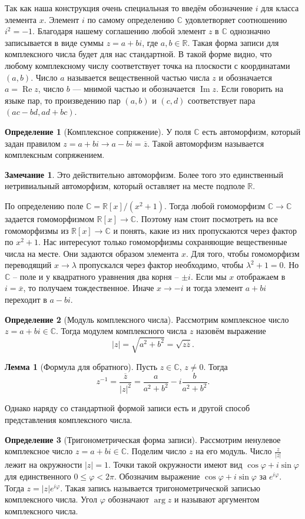 \documentclass[10pt,a4paper,oneside]{book} %
\theoremstyle{definition}
\newtheorem*{rem}{Замечание}
\newtheorem*{defn}{Определение}
\newtheorem{lem}{Лемма}
\newcommand{\mb}[1]{\mathbb{#1}}
\newcommand{\ovl}{\overline}
\newcommand{\im}{\operatorname{Im}}
\newcommand{\re}{\operatorname{Re}}
\def\dfn{\begin{defn}}
\def\edfn{\end{defn}}
\def\lm{\begin{lem}}
\def\elm{\end{lem}}
\def\rm{\begin{rem}}
\def\erm{\end{rem}}
\begin{document}
Так как наша конструкция очень специальная то введём обозначение $i$ для класса элемента $x$. Элемент $i$ по самому определению $\mb C$ удовлетворяет соотношению $i^2=-1$. Благодаря нашему соглашению любой элемент $z$ в $\mb C$ однозначно записывается в виде суммы $z=a+bi$, где $a,b\in \mb R$. Такая форма записи для комплексного числа будет для нас стандартной. В такой форме видно, что любому комплексному числу соответствует точка на плоскости с координатами $(a,b)$. Число $a$ называется вещественной частью числа $z$ и обозначается $a=\re z$, число $b$ --- мнимой частью и обозначается $\im z$. Если говорить на языке пар, то произведению пар $(a,b)$ и $(c,d)$ соответствует пара $(ac-bd,ad+bc)$.

\dfn[Комплексное сопряжение] У поля $\mb C$ есть автоморфизм, который задан правилом $z=a+bi \to a-bi=\ovl{z}$. Такой автоморфизм называется комплексным сопряжением.
\edfn

\rm Это действительно автоморфизм. Более того это единственный нетривиальный автоморфизм, который оставляет на месте подполе $\mb R$.

\proof По определению поле $\mb C = \mb R[x]/(x^2+1)$. Тогда любой гомоморфизм $\mb C \to \mb C$ задается гомоморфизмом $\mb R[x]\to \mb C$. Поэтому нам стоит посмотреть на все гомоморфизмы из $\mb R[x]\to \mb C$ и понять, какие из них пропускаются через фактор по $x^2+1$. Нас интересуют только гомоморфизмы сохраняющие вещественные числа на месте. Они задаются образом элемента $x$. Для того, чтобы гомоморфизм переводящий $x \to \lambda$ пропускался через фактор необходимо, чтобы $\lambda^2+1=0$. Но $\mb C$ -- поле и у квадратного уравнения два корня -- $\pm i$. Если мы $x$ отображаем в $i=\ovl{x}$, то получаем тождественное. Иначе $x\to -i$ и тогда элемент $a+bi$ переходит в $a-bi$.
\endproof
\erm

\dfn[Модуль комплексного числа] Рассмотрим комплексное число $z=a+bi\in \mb C$. Тогда модулем комплексного числа $z$ назовём выражение
$$|z|=\sqrt{a^2+b^2}=\sqrt{z\ovl{z}}.$$
\edfn

\lm[Формула для обратного] Пусть $z\in \mb C$, $z\neq 0$. Тогда
$$ z^{-1} =\frac{\ovl{z}}{|z|^2}= \frac{a}{a^2+b^2}-i\frac{b}{a^2+b^2}.$$
\elm

Однако наряду со стандартной формой записи есть и другой способ представления комплексного числа.

\dfn[Тригонометрическая форма записи] Рассмотрим ненулевое комплексное число $z= a+bi\in\mb C$. Поделим число $z$ на его модуль. Число
$\frac{z}{|z|}$ лежит на окружности $|z| = 1$. Точки такой окружности имеют вид $\cos\varphi +i\sin\varphi$ для единственного $0 \leq \varphi < 2\pi$. Обозначим выражение $\cos\varphi+i\sin\varphi$ за $e^{i\varphi}$. Тогда $z=|z|e^{i\varphi}$.
Такая запись называется тригонометрической записью комплексного числа. Угол $\varphi$ обозначают $\arg z$ и называют
аргументом комплексного числа.
\edfn
\end{document}
